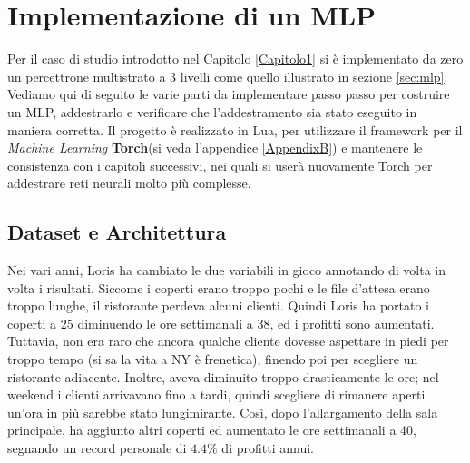 \chapter{Implementazione di un MLP} %
\label{Capitolo2} %
\def \path {Figures/C1}
\def \teoria {Figures/teoria}
Per il caso di studio introdotto nel Capitolo \ref{Capitolo1} si è implementato da zero un percettrone multistrato a 3 livelli come quello illustrato in sezione \ref{sec:mlp}. Vediamo qui di seguito le varie parti da implementare passo passo per costruire un MLP, addestrarlo e verificare che l'addestramento sia stato eseguito in maniera corretta. Il progetto è realizzato in Lua, per utilizzare il framework per il \emph{Machine Learning} \textbf{Torch}(si veda l'appendice \ref{AppendixB}) e mantenere le consistenza con i capitoli successivi, nei quali si userà nuovamente Torch per addestrare reti neurali molto più complesse.

\section{Dataset e Architettura}
Nei vari anni, Loris ha cambiato le due variabili in gioco annotando di volta in volta i risultati. Siccome i coperti erano troppo pochi e le file d'attesa erano troppo lunghe, il ristorante perdeva alcuni clienti. Quindi Loris ha portato i coperti a 25 diminuendo le ore settimanali a 38, ed i profitti sono aumentati. Tuttavia, non era raro che ancora qualche cliente dovesse aspettare in piedi per troppo tempo (si sa la vita a NY è frenetica), finendo poi per scegliere un ristorante adiacente. Inoltre, aveva diminuito troppo drasticamente le ore; nel weekend i clienti arrivavano fino a tardi, quindi scegliere di rimanere aperti un'ora in più sarebbe stato lungimirante. Così, dopo l'allargamento della sala principale, ha aggiunto altri coperti ed aumentato le ore settimanali a 40, segnando un record personale di $4.4\%$ di profitti annui. \\

